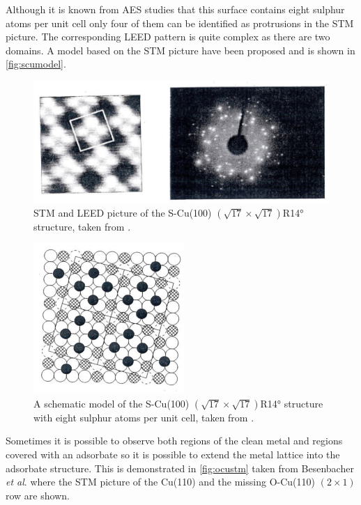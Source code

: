 Although it is known from AES studies that this surface contains eight sulphur atoms per unit cell only four of them can be identified as protrusions in the STM picture. The corresponding LEED pattern is quite complex as there are two domains. A model based on the STM picture have been proposed and is shown in \autoref{fig:scumodel}.

\begin{figure}[h!]
	\begin{center}
	\includegraphics[scale=4]{figures/10_09.png}
	\caption{STM and LEED picture of the S-Cu(100) $(\sqrt{17} \times \sqrt{17})$R\ang{14} structure, taken from \cite{Luigi}.}
	\label{fig:stmleed}
	\end{center}
\end{figure}

\begin{figure}[h!]
	\begin{center}
	\includegraphics[scale=4]{figures/10_10.png}
	\caption{A schematic model of the S-Cu(100) $(\sqrt{17} \times \sqrt{17})$R\ang{14} structure with eight sulphur atoms per unit cell, taken from \cite{Luigi}.}
	\label{fig:scumodel}
	\end{center}
\end{figure}

Sometimes it is possible to observe both regions of the clean metal and regions covered with an adsorbate so it is possible to extend the metal lattice into the adsorbate structure. This is demonstrated in \autoref{fig:ocustm} taken from Besenbacher \textit{et al}. \cite{Besenbacher1} where the STM picture of the Cu(110) and the missing O-Cu(110) $(2\times 1)$ row are shown.

